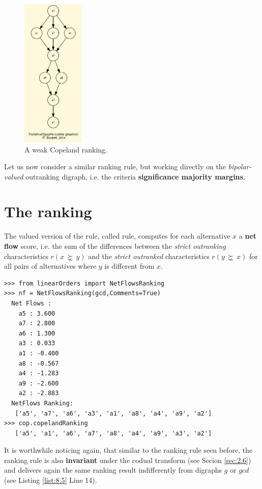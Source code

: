 \begin{figure}[h]
\sidecaption
\includegraphics[width=3cm]{Figures/weakCopelandRanking.png}
\caption{A weak Copeland ranking.}
\label{fig:8.2}       %
\end{figure}

Let us now consider a similar ranking rule, but working directly on the \emph{bipolar-valued} outranking digraph, i.e. the criteria \textbf{significance majority margins}.

\section{The \NetFlows ranking}
\label{sec:8.3}

The valued version of the \Copeland rule, called \NetFlows rule, computes for each alternative $x$ a \textbf{net flow} score,  i.e. the sum of the differences between the \emph{strict outranking} characteristics $r(x\, \succnsim \,y)$ and the \emph{strict outranked} characteristics $r(y\, \succnsim \,x)$ for all pairs of alternatives where $y$ is different from $x$.
  
\begin{lstlisting}[caption={Computing a \NetFlows ranking},label=list:8.5]
>>> from linearOrders import NetFlowsRanking
>>> nf = NetFlowsRanking(gcd,Comments=True)
  Net Flows :
    a5 : 3.600
    a7 : 2.800
    a6 : 1.300
    a3 : 0.033
    a1 : -0.400
    a8 : -0.567
    a4 : -1.283
    a9 : -2.600
    a2 : -2.883
  NetFlows Ranking:
   ['a5', 'a7', 'a6', 'a3', 'a1', 'a8', 'a4', 'a9', 'a2']
>>> cop.copelandRanking
   ['a5', 'a1', 'a6', 'a7', 'a8', 'a4', 'a9', 'a3', 'a2']
\end{lstlisting}

It is worthwhile noticing again, that similar to the \Copeland ranking rule seen before, the \NetFlows ranking rule is also \textbf{invariant} under the codual transform (see Secion \ref{sec:2.6}) and delivers again the same ranking result indifferently from digraphs $g$ or $gcd$ (see Listing \ref{list:8.5} Line 14). 

